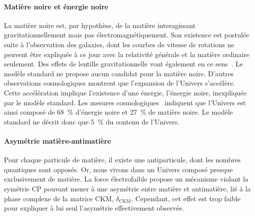 \paragraph{Matière noire et énergie noire}
La matière noire est, par hypothèse, de la matière interagissant gravitationnellement mais pas électromagnétiquement.
Son existence est postulée suite à l'observation des galaxies, dont les courbes de vitesse de rotations ne peuvent être expliquée à ce jour avec la relativité générale et la matière ordinaire seulement. Des effets de lentille gravitationnelle vont également en ce sens~\cite{Clowe_2006}.
Le modèle standard ne propose aucun candidat pour la matière noire.
D'autres observations cosmologiques montrent que l'expansion de l'Univers s'accélère. Cette accélération implique l'existence d'une énergie, l'énergie noire, inexpliquée par le modèle standard.
Les mesures cosmologiques~\cite{planck_2013} indiquent que l'Univers est ainsi composé de \SI{68}{\%} d'énergie noire et \SI{27}{\%} de matière noire. Le modèle standard ne décrit donc que \SI{5}{\%} du contenu de l'Univers.
\paragraph{Asymétrie matière-antimatière}
Pour chaque particule de matière, il existe une antiparticule, dont les nombres quantiques sont opposés.
Or, nous vivons dans un Univers composé presque exclusivement de matière.
La force électrofaible propose un mécanisme violant la symétrie CP pouvant mener à une asymétrie entre matière et antimatière, lié à la phase complexe de la matrice CKM, $\delta_{\text{CKM}}$.
Cependant, cet effet est trop faible pour expliquer à lui seul l'asymétrie effectivement observée.

